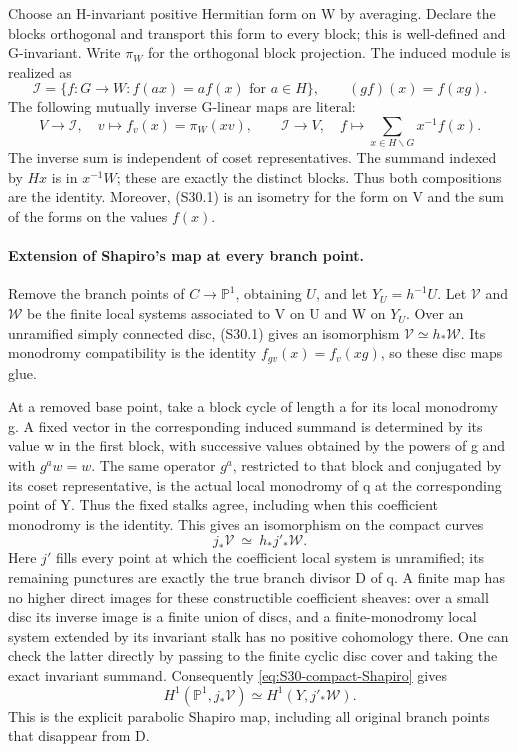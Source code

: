 Choose an H-invariant positive Hermitian form on W by averaging.
Declare the blocks orthogonal and transport this form to every block;
this is well-defined and G-invariant. Write \(\pi_W\) for the
orthogonal block projection. The induced module is realized as
\[
 \mathcal I=\{f:G\to W:f(ax)=a f(x)\text{ for }a\in H\},
 \qquad (g f)(x)=f(xg).
\]
The following mutually inverse G-linear maps are literal:
\[
 V\longrightarrow\mathcal I,\quad
       v\longmapsto f_v(x)=\pi_W(xv),\qquad
 \mathcal I\longrightarrow V,\quad
       f\longmapsto\sum_{x\in H\backslash G}x^{-1}f(x).
                                                               \tag{S30.1}
\]
The inverse sum is independent of coset representatives. The summand
indexed by \(Hx\) is in \(x^{-1}W\); these are exactly the
distinct blocks. Thus both compositions are the identity.
Moreover, (S30.1) is an isometry for the form on V and the sum of the
forms on the values \(f(x)\).

\paragraph{Extension of Shapiro's map at every branch point.}
Remove the branch points of \(C\to\mathbb P^1\), obtaining
\(U\), and let \(Y_U=h^{-1}U\). Let \(\mathcal V\)
and \(\mathcal W\) be the finite local systems associated to
V on U and W on \(Y_U\). Over an unramified simply connected
disc, (S30.1) gives an isomorphism
\(\mathcal V\simeq h_*\mathcal W\).
Its monodromy compatibility is the identity
\(f_{gv}(x)=f_v(xg)\), so these disc maps glue.

At a removed base point, take a block cycle of length a for its local
monodromy g. A fixed vector in the corresponding induced summand is
determined by its value w in the first block, with successive values
obtained by the powers of g and with \(g^a w=w\). The same
operator \(g^a\), restricted to that block and conjugated by its
coset representative, is the actual local monodromy of q at the
corresponding point of Y. Thus the fixed stalks agree, including when
this coefficient monodromy is the identity. This gives an isomorphism
on the compact curves
\begin{equation}\label{eq:S30-compact-Shapiro}
       j_*\mathcal V\ \simeq\ h_*j'_*\mathcal W.
\end{equation}
Here \(j'\) fills every point at which the coefficient local
system is unramified; its remaining punctures are exactly the true
branch divisor D of q. A finite map has no higher direct images for
these constructible coefficient sheaves: over a small disc its inverse
image is a finite union of discs, and a finite-monodromy local system
extended by its invariant stalk has no positive cohomology there.
One can check the latter directly by passing to the finite cyclic
disc cover and taking the exact invariant summand. Consequently
\eqref{eq:S30-compact-Shapiro} gives
\begin{equation}\label{eq:S30-parabolic-Shapiro}
 H^1(\mathbb P^1,j_*\mathcal V)
            \simeq H^1(Y,j'_*\mathcal W).
\end{equation}
This is the explicit parabolic Shapiro map, including all original
branch points that disappear from D.

